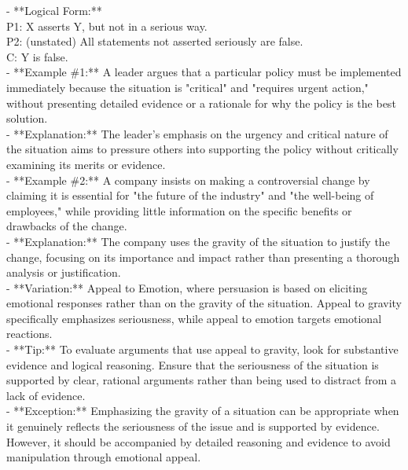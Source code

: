 \documentclass[a4paper,12pt,single,pdftex]{scrartcl}
\begin{document}
    
      - **Logical Form:**
    \\

    
      P1: X asserts Y, but not in a serious way.
    \\

    
      P2: (unstated) All statements not asserted seriously are false.
    \\

    
      C: Y is false.
    \\

    
      - **Example \#1:** A leader argues that a particular policy must be implemented immediately because the situation is "critical" and "requires urgent action," without presenting detailed evidence or a rationale for why the policy is the best solution.
    \\

    
      - **Explanation:** The leader's emphasis on the urgency and critical nature of the situation aims to pressure others into supporting the policy without critically examining its merits or evidence.
    \\

    
      - **Example \#2:** A company insists on making a controversial change by claiming it is essential for "the future of the industry" and "the well-being of employees," while providing little information on the specific benefits or drawbacks of the change.
    \\

    
      - **Explanation:** The company uses the gravity of the situation to justify the change, focusing on its importance and impact rather than presenting a thorough analysis or justification.
    \\

    
      - **Variation:** Appeal to Emotion, where persuasion is based on eliciting emotional responses rather than on the gravity of the situation. Appeal to gravity specifically emphasizes seriousness, while appeal to emotion targets emotional reactions.
    \\

    
      - **Tip:** To evaluate arguments that use appeal to gravity, look for substantive evidence and logical reasoning. Ensure that the seriousness of the situation is supported by clear, rational arguments rather than being used to distract from a lack of evidence.
    \\

    
      - **Exception:** Emphasizing the gravity of a situation can be appropriate when it genuinely reflects the seriousness of the issue and is supported by evidence. However, it should be accompanied by detailed reasoning and evidence to avoid manipulation through emotional appeal.
    \\
\end{document}
